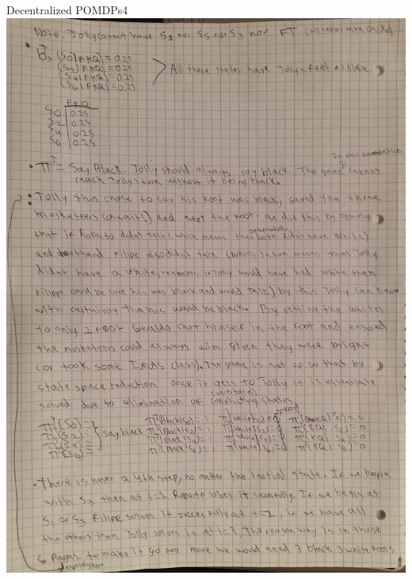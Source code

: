 \begin{questions}
\begin{question}{Decentralized POMDPs}{4}
	\includegraphics[scale=0.2]{p6.jpg}
		\newpage

\end{question}
\end{questions}




